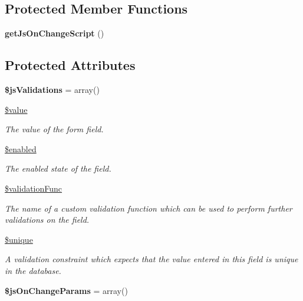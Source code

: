 \subsection*{Protected Member Functions}
\begin{DoxyCompactItemize}
\item 
\hypertarget{class_field_a9a05594f8c2b04e6fb339997e46c0345}{
{\bfseries getJsOnChangeScript} ()}
\label{class_field_a9a05594f8c2b04e6fb339997e46c0345}

\end{DoxyCompactItemize}
\subsection*{Protected Attributes}
\begin{DoxyCompactItemize}
\item 
\hypertarget{class_field_a6f030cfe5b33704f1905d8d907c2c0dc}{
{\bfseries \$jsValidations} = array()}
\label{class_field_a6f030cfe5b33704f1905d8d907c2c0dc}

\item 
\hypertarget{class_field_a90340f029306f8d27392439e5f08bdd7}{
\hyperlink{class_field_a90340f029306f8d27392439e5f08bdd7}{\$value}}
\label{class_field_a90340f029306f8d27392439e5f08bdd7}

\begin{DoxyCompactList}\small\item\em The value of the form field. \item\end{DoxyCompactList}\item 
\hypertarget{class_field_a659b615b21d0b5f8f87e0a8d4b3cc1a2}{
\hyperlink{class_field_a659b615b21d0b5f8f87e0a8d4b3cc1a2}{\$enabled}}
\label{class_field_a659b615b21d0b5f8f87e0a8d4b3cc1a2}

\begin{DoxyCompactList}\small\item\em The enabled state of the field. \item\end{DoxyCompactList}\item 
\hyperlink{class_field_ad9706349922ca48c0bf9ca7cc2f8b208}{\$validationFunc}
\begin{DoxyCompactList}\small\item\em The name of a custom validation function which can be used to perform further validations on the field. \item\end{DoxyCompactList}\item 
\hyperlink{class_field_ad82d237d3764f3789ca71fa6ab67b171}{\$unique}
\begin{DoxyCompactList}\small\item\em A validation constraint which expects that the value entered in this field is unique in the database. \item\end{DoxyCompactList}\item 
\hypertarget{class_field_afc148b58423b757bab25b895ced4a408}{
{\bfseries \$jsOnChangeParams} = array()}
\label{class_field_afc148b58423b757bab25b895ced4a408}

\end{DoxyCompactItemize}


